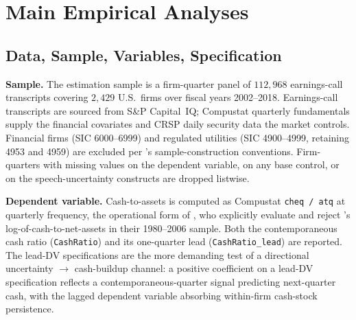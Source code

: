 
\section{Main Empirical Analyses}
\label{sec:main}

\subsection{Data, Sample, Variables, Specification}
\label{sec:main:setup}

\textbf{Sample.} The estimation sample is a firm-quarter panel of $112{,}968$ earnings-call transcripts covering $2{,}429$ U.S.\ firms over fiscal years 2002--2018. Earnings-call transcripts are sourced from S\&P Capital~IQ; Compustat quarterly fundamentals supply the financial covariates and CRSP daily security data the market controls. Financial firms (SIC 6000--6999) and regulated utilities (SIC 4900--4999, retaining 4953 and 4959) are excluded per \citeauthor{bates2009}'s sample-construction conventions. Firm-quarters with missing values on the dependent variable, on any base control, or on the speech-uncertainty constructs are dropped listwise.

\textbf{Dependent variable.} Cash-to-assets is computed as Compustat \texttt{cheq~/~atq} at quarterly frequency, the operational form of , who explicitly evaluate and reject \citeauthor{opler1999}'s log-of-cash-to-net-assets in their 1980--2006 sample. Both the contemporaneous cash ratio (\texttt{CashRatio}) and its one-quarter lead (\texttt{CashRatio\_lead}) are reported. The lead-DV specifications are the more demanding test of a directional uncertainty $\to$ cash-buildup channel: a positive coefficient on a lead-DV specification reflects a contemporaneous-quarter signal predicting next-quarter cash, with the lagged dependent variable absorbing within-firm cash-stock persistence.


